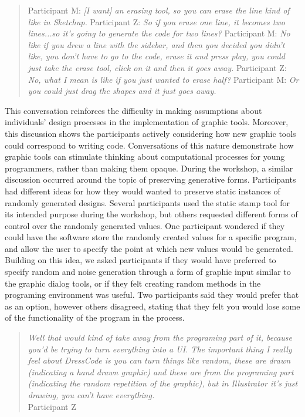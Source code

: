 \documentclass{sigchi}
\begin{document}
\begin{quotation}
Participant M: \textit{[I want] an erasing tool, so you can erase the line kind of like in Sketchup.}  
Participant Z: \textit{So if you erase one line, it becomes two lines...so it's going to generate the code for two lines?}
Participant M: \textit{No like if you drew a line with the sidebar, and then you decided you didn't like, you don't have to go to the code, erase it and press play, you could just take the erase tool, click on it and then it goes away.}
Participant Z:  \textit{No, what I mean is like if you just wanted to erase half?}
Participant M: \textit{Or you could just drag the shapes and it just goes away.}
\end{quotation}

This conversation reinforces the difficulty in making assumptions about individuals' design processes in the implementation of graphic tools. Moreover, this discussion shows the participants actively considering how new graphic tools could correspond to writing code. Conversations of this nature demonstrate how graphic tools can stimulate thinking about computational processes for young programmers, rather than making them opaque. During the workshop, a similar discussion occurred around the topic of preserving generative forms. Participants had different ideas for how they would wanted to preserve static instances of randomly generated designs. Several participants used the static stamp tool for its intended purpose during the workshop, but others requested different forms of control over the randomly generated values. One participant wondered if they could have the software store the randomly created values for a specific program, and allow the user to specify the point at which new values would be generated. Building on this idea, we asked participants if they would have preferred to specify random and noise generation through a form of graphic input similar to the graphic dialog tools, or if they felt creating random methods in the programing environment was useful. Two participants said they would prefer that as an option, however others disagreed, stating that they felt you would lose some of the functionality of the program in the process.
\begin{quotation} 
\textit{Well that would kind of take away from the programing part of it, because you'd be trying to turn everything into a UI.
The important thing I really feel about DressCode is you can turn things like random, these are drawn (indicating a hand drawn graphic) and these are from the programing part (indicating the random repetition of the graphic), but in Illustrator it's just drawing, you can't have everything.}
\\Participant Z
\end{quotation}
\end{document}
